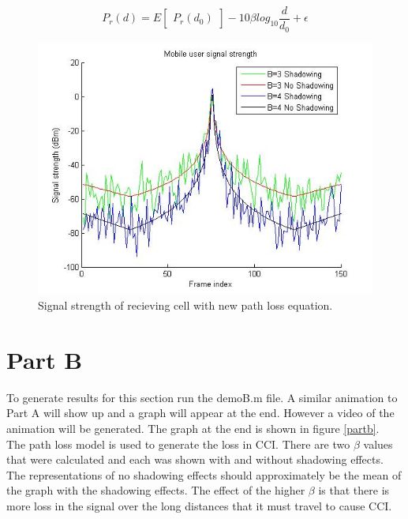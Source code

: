 \documentclass{article}
\begin{document}
\begin{equation}\label{pathloss}
P_r(d)=E\begin{bmatrix}P_r(d_0)\end{bmatrix}-10\beta log_{10}\dfrac{d}{d_0}+\epsilon
\end{equation}

\begin{figure}[h]
\centerline{\includegraphics[width=5in]{latex/images/PARTA.jpg}}
\caption{Signal strength of recieving cell with new path loss equation.}
\label{parta}
\end{figure}

\clearpage

\section{Part B}\label{partB}

To generate results for this section run the demoB.m file. A similar animation to Part A will show up and a graph will appear at the end. However a video of the animation will be generated. The graph at the end is shown in figure \ref{partb}. \\

The path loss model is used to generate the loss in CCI. There are two \( \beta \) values that were calculated and each was shown with and without shadowing effects. The representations of no shadowing effects should approximately be the mean of the graph with the shadowing effects. The effect of the higher \( \beta \) is that there is more loss in the signal over the long distances that it must travel to cause CCI. \\
\end{document}
